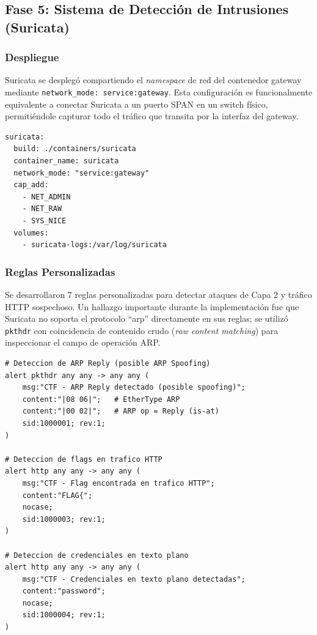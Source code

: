 \documentclass[12pt, a4paper]{article}
\begin{document}
\subsection{Fase 5: Sistema de Detecci\'on de Intrusiones (Suricata)}

\subsubsection{Despliegue}

Suricata se despleg\'o compartiendo el \textit{namespace} de red del contenedor gateway mediante \texttt{network\_mode: service:gateway}. Esta configuraci\'on es funcionalmente equivalente a conectar Suricata a un puerto SPAN en un switch f\'isico, permiti\'endole capturar todo el tr\'afico que transita por la interfaz del gateway.

\begin{lstlisting}[style=yamlstyle, caption={Configuraci\'on de Suricata en docker-compose.yml}]
suricata:
  build: ./containers/suricata
  container_name: suricata
  network_mode: "service:gateway"
  cap_add:
    - NET_ADMIN
    - NET_RAW
    - SYS_NICE
  volumes:
    - suricata-logs:/var/log/suricata
\end{lstlisting}

\subsubsection{Reglas Personalizadas}

Se desarrollaron 7 reglas personalizadas para detectar ataques de Capa 2 y tr\'afico HTTP sospechoso. Un hallazgo importante durante la implementaci\'on fue que Suricata no soporta el protocolo ``arp'' directamente en sus reglas; se utiliz\'o \texttt{pkthdr} con coincidencia de contenido crudo (\textit{raw content matching}) para inspeccionar el campo de operaci\'on ARP.

\begin{lstlisting}[style=rulestyle, caption={Ejemplos de reglas personalizadas de Suricata}]
# Deteccion de ARP Reply (posible ARP Spoofing)
alert pkthdr any any -> any any (
    msg:"CTF - ARP Reply detectado (posible spoofing)";
    content:"|08 06|";   # EtherType ARP
    content:"|00 02|";   # ARP op = Reply (is-at)
    sid:1000001; rev:1;
)

# Deteccion de flags en trafico HTTP
alert http any any -> any any (
    msg:"CTF - Flag encontrada en trafico HTTP";
    content:"FLAG{";
    nocase;
    sid:1000003; rev:1;
)

# Deteccion de credenciales en texto plano
alert http any any -> any any (
    msg:"CTF - Credenciales en texto plano detectadas";
    content:"password";
    nocase;
    sid:1000004; rev:1;
)
\end{lstlisting}
\end{document}
